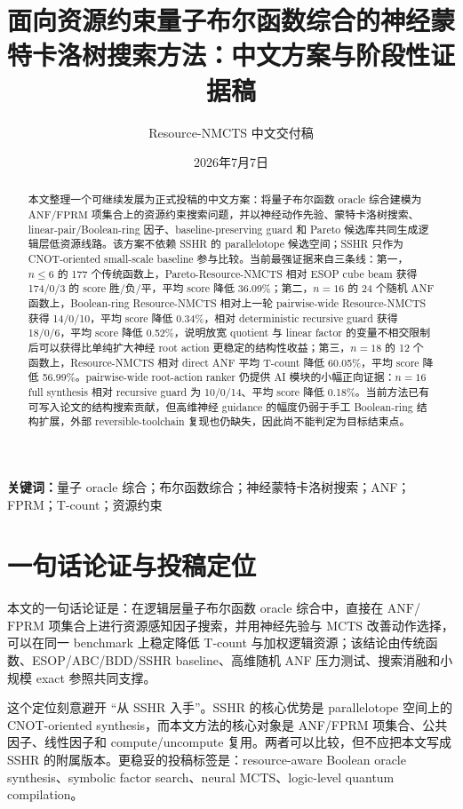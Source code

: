 \documentclass[UTF8,fontset=macnew,11pt]{ctexart}
\title{面向资源约束量子布尔函数综合的神经蒙特卡洛树搜索方法：中文方案与阶段性证据稿}
\author{Resource-NMCTS 中文交付稿}
\date{2026年7月7日}
\newcommand{\method}{Resource-NMCTS}
\newcommand{\pareto}{Pareto-Resource-NMCTS}
\newcommand{\anf}{\ensuremath{\mathrm{ANF}}}
\newcommand{\fprm}{\ensuremath{\mathrm{FPRM}}}
\newcommand{\mcts}{\ensuremath{\mathrm{MCTS}}}
\begin{document}
\maketitle

\begin{abstract}
本文整理一个可继续发展为正式投稿的中文方案：将量子布尔函数 oracle 综合建模为 \anf{}/\fprm{} 项集合上的资源约束搜索问题，并以神经动作先验、蒙特卡洛树搜索、linear-pair/Boolean-ring 因子、baseline-preserving guard 和 Pareto 候选库共同生成逻辑层低资源线路。该方案不依赖 SSHR 的 parallelotope 候选空间；SSHR 只作为 CNOT-oriented small-scale baseline 参与比较。当前最强证据来自三条线：第一，$n\leq6$ 的 177 个传统函数上，\pareto{} 相对 ESOP cube beam 获得 174/0/3 的 score 胜/负/平，平均 score 降低 36.09\%；第二，$n=16$ 的 24 个随机 ANF 函数上，Boolean-ring \method{} 相对上一轮 pairwise-wide \method{} 获得 14/0/10，平均 score 降低 0.34\%，相对 deterministic recursive guard 获得 18/0/6，平均 score 降低 0.52\%，说明放宽 quotient 与 linear factor 的变量不相交限制后可以获得比单纯扩大神经 root action 更稳定的结构性收益；第三，$n=18$ 的 12 个函数上，\method{} 相对 direct ANF 平均 T-count 降低 60.05\%，平均 score 降低 56.99\%。pairwise-wide root-action ranker 仍提供 AI 模块的小幅正向证据：$n=16$ full synthesis 相对 recursive guard 为 10/0/14、平均 score 降低 0.18\%。当前方法已有可写入论文的结构搜索贡献，但高维神经 guidance 的幅度仍弱于手工 Boolean-ring 结构扩展，外部 reversible-toolchain 复现也仍缺失，因此尚不能判定为目标结束点。
\end{abstract}

\noindent\textbf{关键词：}量子 oracle 综合；布尔函数综合；神经蒙特卡洛树搜索；ANF；FPRM；T-count；资源约束

\section{一句话论证与投稿定位}

本文的一句话论证是：在逻辑层量子布尔函数 oracle 综合中，直接在 \anf{}/\fprm{} 项集合上进行资源感知因子搜索，并用神经先验与 \mcts{} 改善动作选择，可以在同一 benchmark 上稳定降低 T-count 与加权逻辑资源；该结论由传统函数、ESOP/ABC/BDD/SSHR baseline、高维随机 ANF 压力测试、搜索消融和小规模 exact 参照共同支撑。

这个定位刻意避开 ``从 SSHR 入手''。SSHR 的核心优势是 parallelotope 空间上的 CNOT-oriented synthesis，而本文方法的核心对象是 ANF/FPRM 项集合、公共因子、线性因子和 compute/uncompute 复用。两者可以比较，但不应把本文写成 SSHR 的附属版本。更稳妥的投稿标签是：resource-aware Boolean oracle synthesis、symbolic factor search、neural MCTS、logic-level quantum compilation。
\end{document}
